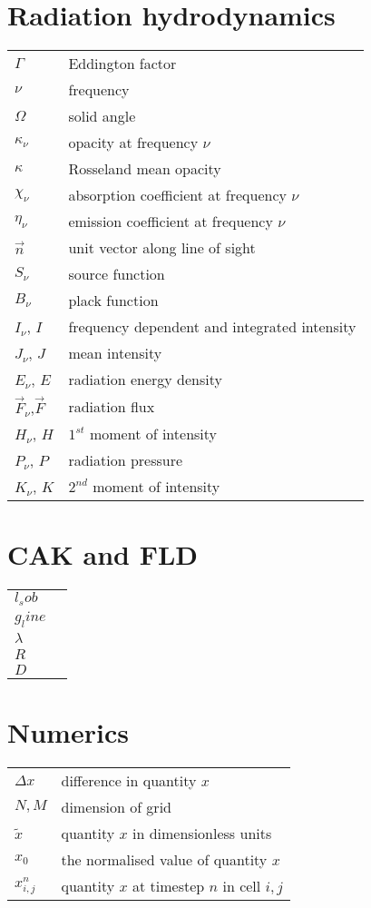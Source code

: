 \begin{multicols}{2}
\section*{Radiation hydrodynamics}
\begin{tabular}{ll}
$\Gamma$      & Eddington factor \\
$\nu$         & frequency \\
$\Omega$      & solid angle \\
$\kappa_\nu$  & opacity at frequency $\nu$ \\
$\kappa$      & Rosseland mean opacity\\
$\chi_\nu$    & absorption coefficient at frequency $\nu$ \\
$\eta_\nu$    & emission coefficient at frequency $\nu$ \\
$\vec{n}$     & unit vector along line of sight\\
$S_\nu$       & source function\\
$B_\nu$       & plack function\\
$I_\nu$, $I$  & frequency dependent and integrated intensity\\
$J_\nu$, $J$  & mean intensity\\
$E_\nu$, $E$  & radiation energy density\\
$\vec{F}_\nu$,$\vec{F}$ & radiation flux\\
$H_\nu$, $H$  & $1^{st}$ moment of intensity\\
$P_\nu$, $P$  & radiation pressure\\
$K_\nu$, $K$  & $2^{nd}$ moment of intensity \\
\end{tabular}

\section*{CAK and FLD}
\begin{tabular}{ll}
$l_sob$          & \\
$g_line$         & \\
$\lambda$        & \\
$R$              & \\
$D$              & \\
\end{tabular}

\section*{Numerics}
\begin{tabular}{ll}
$\Delta x$        & difference in quantity $x$\\
$N,M$            & dimension of grid \\
$\tilde{x}$      & quantity $x$ in dimensionless units \\
$x_0$		     & the normalised value of quantity $x$ \\
$x_{i,j}^n$	     & quantity $x$ at timestep $n$ in cell $i,j$ \\
\end{tabular}


\end{multicols}
